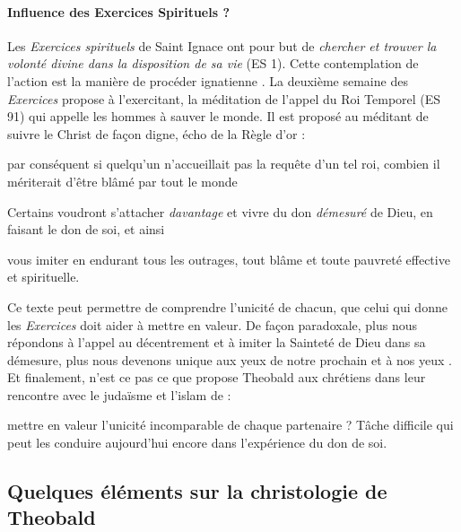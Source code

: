 \paragraph{Influence des Exercices Spirituels ?} Les \textit{Exercices spirituels} de Saint Ignace ont pour but de \textit{chercher et trouver la volonté divine dans la disposition de sa vie} (ES 1). Cette   contemplation de l'action est la manière de procéder ignatienne \cite[p.9]{theobald_christianisme_2007}. La deuxième semaine des \textit{Exercices} propose à l'exercitant, la méditation de l'appel du Roi Temporel (ES 91) qui appelle les hommes à sauver le monde. Il est proposé au méditant de suivre le Christ de façon digne, écho de la Règle d'or :
\begin{singlequote}
    par conséquent si quelqu'un n'accueillait pas la requête d'un tel roi, combien il mériterait d'être blâmé par tout le monde
\end{singlequote}

Certains voudront s'attacher \textit{davantage} et vivre du don \textit{démesuré} de Dieu, en faisant le don de soi, et ainsi 
\begin{singlequote}
    vous imiter en endurant tous les outrages, tout blâme et toute pauvreté effective et spirituelle.
\end{singlequote}

Ce texte peut permettre de comprendre l'unicité de chacun, que celui qui donne les \textit{Exercices} doit aider à mettre en valeur. De façon paradoxale, plus nous répondons à l'appel au décentrement et à imiter la Sainteté de Dieu dans sa démesure, plus nous devenons unique aux yeux de notre prochain et à nos yeux \cite[p. 827]{theobald_christianisme_2007}. Et finalement, n'est ce pas ce que propose Theobald aux chrétiens dans leur rencontre avec le judaïsme et l'islam de :
\begin{singlequote}
    [\ldots] mettre en valeur l'unicité incomparable de chaque partenaire ? Tâche difficile qui peut  les conduire aujourd'hui encore dans l'expérience du don de soi. \cite[p. 797]{theobald_christianisme_2007}
\end{singlequote} 
 



\subsection{Quelques éléments sur la christologie de Theobald}

